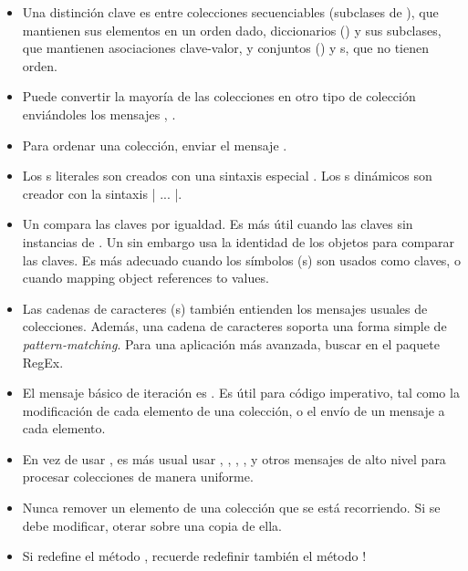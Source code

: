 \documentclass[a4paper,10pt,twoside]{book}
\begin{document}
\begin{itemize}
  \item Una distinci\'on clave es entre colecciones secuenciables (subclases de ), que mantienen sus elementos en un orden dado, diccionarios () y sus subclases, que mantienen asociaciones clave-valor, y conjuntos () y s, que no tienen orden.
  \item Puede convertir la mayor\'ia de las colecciones en otro tipo de colecci\'on envi\'andoles los mensajes ,  \etc.
  \item Para ordenar una colecci\'on, enviar el mensaje .
  \item Los s literales son creados con una sintaxis especial .  Los s din\'amicos son creador con la sintaxis \ct|{ ... }|.
  \item Un  compara las claves por igualdad. Es m\'as \'util cuando las claves sin instancias de . Un  sin embargo usa la identidad de los objetos para comparar las claves. Es m\'as adecuado cuando los s\'imbolos (s) son usados como claves, o cuando mapping object references to values.
  \item Las cadenas de caracteres (s) tambi\'en entienden los mensajes usuales de colecciones.  Adem\'as, una cadena de caracteres soporta una forma simple de \textit{pattern-matching}. Para una aplicaci\'on m\'as avanzada, buscar en el paquete RegEx.
  \item El mensaje b\'asico de iteraci\'on es . Es \'util para c\'odigo imperativo, tal como la modificaci\'on de cada elemento de una colecci\'on, o el env\'io de un mensaje a cada elemento.
  \item En vez de usar , es m\'as usual usar , , , ,  y otros mensajes de alto nivel para procesar colecciones de manera uniforme.
  \item Nunca remover un elemento de una colecci\'on que se est\'a recorriendo. Si se debe modificar, oterar sobre una copia de ella.
  \item Si redefine el m\'etodo \ct{=}, recuerde redefinir tambi\'en el m\'etodo !
\end{itemize}

\ifx\wholebook\relax\else
   
   
\end{document}
